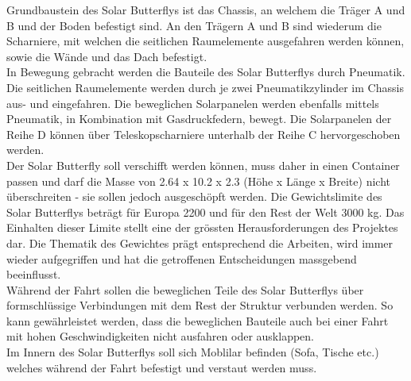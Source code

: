 Grundbaustein des Solar Butterflys ist das Chassis, an welchem die Träger A und B und der Boden befestigt sind. An den Trägern A und B sind wiederum die Scharniere, mit welchen die seitlichen Raumelemente ausgefahren werden können, sowie die Wände und das Dach befestigt.\\
In Bewegung gebracht werden die Bauteile des Solar Butterflys durch Pneumatik. Die seitlichen Raumelemente werden durch je zwei Pneumatikzylinder im Chassis aus- und eingefahren. Die beweglichen Solarpanelen werden ebenfalls mittels Pneumatik, in Kombination mit Gasdruckfedern, bewegt. Die Solarpanelen der Reihe D können über Teleskopscharniere unterhalb der Reihe C hervorgeschoben werden.\\
Der Solar Butterfly soll verschifft werden können, muss daher in einen Container passen und darf die Masse von 2.64 x 10.2 x 2.3 (Höhe x Länge x Breite) nicht überschreiten - sie sollen jedoch ausgeschöpft werden. Die Gewichtslimite des Solar Butterflys beträgt für Europa 2200 und für den Rest der Welt 3000 kg. Das Einhalten dieser Limite stellt eine der grössten Herausforderungen des Projektes dar. Die Thematik des Gewichtes prägt entsprechend die Arbeiten, wird immer wieder aufgegriffen und hat die getroffenen Entscheidungen massgebend beeinflusst.\\
Während der Fahrt sollen die beweglichen Teile des Solar Butterflys über formschlüssige Verbindungen mit dem Rest der Struktur verbunden werden. So kann gewährleistet werden, dass die beweglichen Bauteile auch bei einer Fahrt mit hohen Geschwindigkeiten nicht ausfahren oder ausklappen.\\
Im Innern des Solar Butterflys soll sich Moblilar befinden (Sofa, Tische etc.) welches während der Fahrt befestigt und verstaut werden muss.

\newpage
